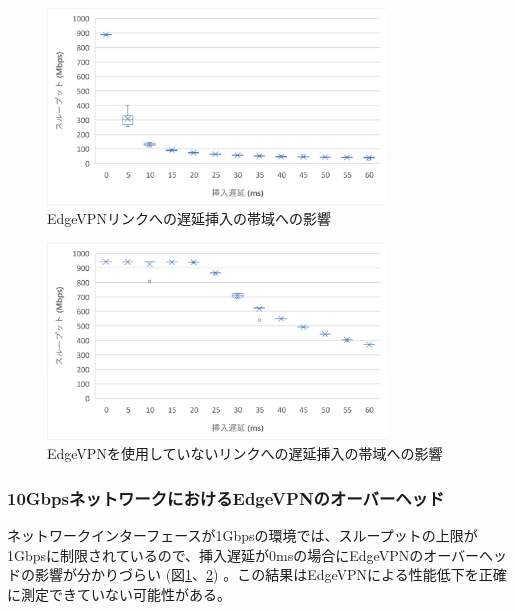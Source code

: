 \begin{figure}[t]
    \centering
    \includegraphics[width=0.8\textwidth,keepaspectratio,clip]{img/bandwidth_withEdgeVPN.pdf}
    \caption{EdgeVPNリンクへの遅延挿入の帯域への影響}
    \label{fig:band_with_edge}
\end{figure}

\begin{figure}[t]
    \centering
    \includegraphics[width=0.8\textwidth,keepaspectratio,clip]{img/bandwidth_withoutEdgeVPN.pdf}
    \caption{EdgeVPNを使用していないリンクへの遅延挿入の帯域への影響}
    \label{fig:band_without_edge}
\end{figure}

\subsubsection{10GbpsネットワークにおけるEdgeVPNのオーバーヘッド}
ネットワークインターフェースが1Gbpsの環境では、スループットの上限が1Gbpsに制限されているので、挿入遅延が0msの場合にEdgeVPNのオーバーヘッドの影響が分かりづらい (図\ref{fig:band_with_edge}、\ref{fig:band_without_edge}) 。この結果はEdgeVPNによる性能低下を正確に測定できていない可能性がある。

